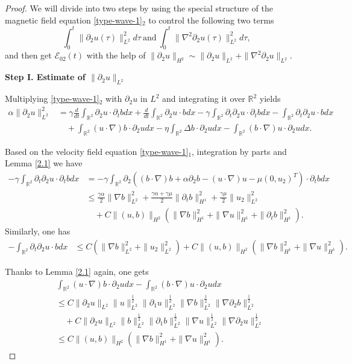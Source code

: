 \documentclass[reqno,11pt]{amsart}
\def\R{\mathbb R}
\numberwithin{Thm}{section}
\begin{document}
\begin{proof}
 We will divide into two steps by using the special structure of the magnetic field equation \eqref{type-wave-1}$_2$ to control the following two terms
$$\int_0^t\|\partial_2u(\tau)\|^2_{L^2}d\tau  \ \text{and} \ \int_0^t\|\nabla^2\partial_2u(\tau)\|^2_{L^2}d\tau,$$   and then get $\mathcal{E}_{02}(t)$ with the help of  $\|\partial_2u\|_{H^2}\sim\|\partial_2u\|_{L^2}+\|\nabla^2\partial_2u\|_{L^2}$.

\par\textbf{Step I. Estimate of $\|\partial_2u\|_{L^2}$}


Multiplying \eqref{type-wave-1}$_2$ with $\partial_2 u$ in $L^2$ and integrating it over $\mathbb{R}^2$ yields
\begin{align*}
\alpha\|\partial_2u\|^2_{L^2}&=\gamma\frac{d}{dt}\int_{\R^2}\partial_2u\cdot\partial_t bdx+\frac{d}{dt}\int_{\R^2}\partial_2u\cdot bdx-\gamma\int_{\R^2}\partial_t \partial_2u\cdot \partial_tbdx-\int_{\R^2}\partial_t\partial_2 u\cdot bdx\nonumber\\
&\quad+\int_{\R^2}(u\cdot\nabla) b\cdot\partial_2u dx-\eta\int_{\R^2}\Delta b\cdot\partial_2u dx-\int_{\R^2}(b\cdot\nabla) u\cdot\partial_2u dx.
\end{align*}


Based on the velocity field equation \eqref{type-wave-1}$_1$, integration  by parts and Lemma \ref{2.1} we have
\begin{align}
-\gamma\int_{\R^2}\partial_t\partial_2 u\cdot \partial_tbdx
&=-\gamma\int_{\R^2}\partial_2((b\cdot\nabla) b+\alpha\partial_2b-(u\cdot\nabla) u-\mu (0,u_2)^{T})\cdot\partial_t bdx\nonumber\\
&\leq \frac{\gamma\alpha}{2}\|\nabla b\|_{L^2}^2+\frac{\gamma\alpha+\gamma\mu}{2}\|\partial_t b\|_{H^1}^2+\frac{\gamma\mu}{2}\|u_2\|_{L^2}^2\nonumber\\
&\quad+ C\| (u,b)\|_{H^{2}}\left(\|\nabla b\|_{H^{1}}^2+\|\nabla u\|_{H^{1}}^2+\|\partial_t b\|_{H^1}^2\right).\label{J1}
\end{align}
Similarly, one has
\begin{align*}
-\int_{\R^2}\partial_t\partial_2 u\cdot bdx&\leq C\left(\|\nabla b\|_{L^2}^2+\|u_2\|_{L^2}^2\right)+ C\| (u,b)\|_{H^{2}}\left(\|\nabla b\|_{H^{1}}^2+\|\nabla u\|_{H^{1}}^2\right).
\end{align*}



Thanks to  Lemma \ref{2.1} again, one gets
\begin{align*}
&\int_{\R^2}(u\cdot\nabla) b\cdot\partial_2u dx-\int_{\R^2}(b\cdot\nabla) u\cdot\partial_2u dx\nonumber \\&\leq C\|\partial_2 u\|_{L^{2}}\|u\|_{L^{2}}^{\frac{1}{2}}\|\partial_1 u\|_{L^{2}}^{\frac{1}{2}}\|\nabla b\|_{L^{2}}^{\frac{1}{2}}\|\nabla\partial_2 b\|_{L^{2}}^{\frac{1}{2}}\nonumber\\
&\quad+ C\|\partial_2 u\|_{L^{2}}\|b\|_{L^{2}}^{\frac{1}{2}}\|\partial_1 b\|_{L^{2}}^{\frac{1}{2}}\|\nabla u\|_{L^{2}}^{\frac{1}{2}}\|\nabla\partial_2 u\|_{L^{2}}^{\frac{1}{2}}\nonumber\\
&\leq C\| (u,b)\|_{H^{2}}\left(\|\nabla b\|_{H^{1}}^2+\|\nabla u\|_{H^{1}}^2\right).
\end{align*}


\end{proof}
\end{document}
